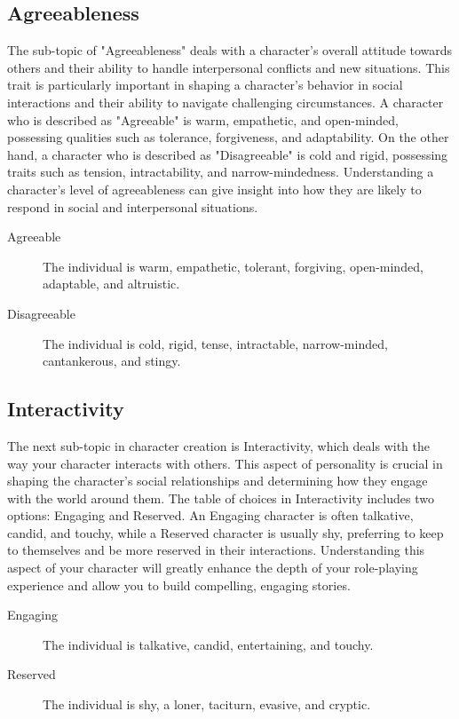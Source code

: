 \documentclass[12pt]{book}
\begin{document}
\subsection{\textbf{Agreeableness}}

The sub-topic of "Agreeableness" deals with a character's overall attitude towards others and their ability to handle interpersonal conflicts and new situations. This trait is particularly important in shaping a character's behavior in social interactions and their ability to navigate challenging circumstances. A character who is described as "Agreeable" is warm, empathetic, and open-minded, possessing qualities such as tolerance, forgiveness, and adaptability. On the other hand, a character who is described as "Disagreeable" is cold and rigid, possessing traits such as tension, intractability, and narrow-mindedness. Understanding a character's level of agreeableness can give insight into how they are likely to respond in social and interpersonal situations.

\begin{description}
    \item[Agreeable] The individual is warm, empathetic, tolerant, forgiving, open-minded, adaptable, and altruistic.
    \item[Disagreeable] The individual is cold, rigid, tense, intractable, narrow-minded, cantankerous, and stingy.
\end{description}

\subsection{\textbf{Interactivity}}

The next sub-topic in character creation is Interactivity, which deals with the way your character interacts with others. This aspect of personality is crucial in shaping the character's social relationships and determining how they engage with the world around them. The table of choices in Interactivity includes two options: Engaging and Reserved. An Engaging character is often talkative, candid, and touchy, while a Reserved character is usually shy, preferring to keep to themselves and be more reserved in their interactions. Understanding this aspect of your character will greatly enhance the depth of your role-playing experience and allow you to build compelling, engaging stories.

\begin{description}
    \item[Engaging] The individual is talkative, candid, entertaining, and touchy.
    \item[Reserved] The individual is shy, a loner, taciturn, evasive, and cryptic.
\end{description}
\end{document}
